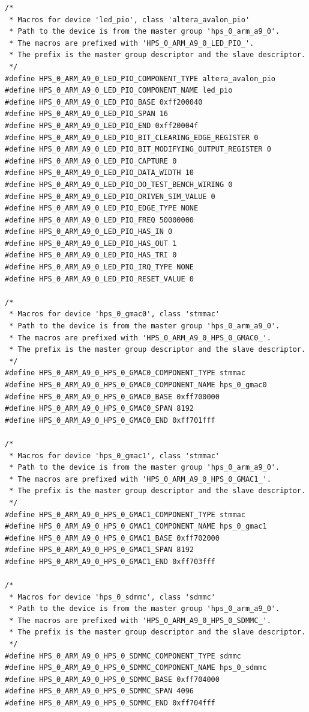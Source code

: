 \documentclass[conference]{IEEEtran}
\begin{document}
\begin{lstlisting}
/*
 * Macros for device 'led_pio', class 'altera_avalon_pio'
 * Path to the device is from the master group 'hps_0_arm_a9_0'.
 * The macros are prefixed with 'HPS_0_ARM_A9_0_LED_PIO_'.
 * The prefix is the master group descriptor and the slave descriptor.
 */
#define HPS_0_ARM_A9_0_LED_PIO_COMPONENT_TYPE altera_avalon_pio
#define HPS_0_ARM_A9_0_LED_PIO_COMPONENT_NAME led_pio
#define HPS_0_ARM_A9_0_LED_PIO_BASE 0xff200040
#define HPS_0_ARM_A9_0_LED_PIO_SPAN 16
#define HPS_0_ARM_A9_0_LED_PIO_END 0xff20004f
#define HPS_0_ARM_A9_0_LED_PIO_BIT_CLEARING_EDGE_REGISTER 0
#define HPS_0_ARM_A9_0_LED_PIO_BIT_MODIFYING_OUTPUT_REGISTER 0
#define HPS_0_ARM_A9_0_LED_PIO_CAPTURE 0
#define HPS_0_ARM_A9_0_LED_PIO_DATA_WIDTH 10
#define HPS_0_ARM_A9_0_LED_PIO_DO_TEST_BENCH_WIRING 0
#define HPS_0_ARM_A9_0_LED_PIO_DRIVEN_SIM_VALUE 0
#define HPS_0_ARM_A9_0_LED_PIO_EDGE_TYPE NONE
#define HPS_0_ARM_A9_0_LED_PIO_FREQ 50000000
#define HPS_0_ARM_A9_0_LED_PIO_HAS_IN 0
#define HPS_0_ARM_A9_0_LED_PIO_HAS_OUT 1
#define HPS_0_ARM_A9_0_LED_PIO_HAS_TRI 0
#define HPS_0_ARM_A9_0_LED_PIO_IRQ_TYPE NONE
#define HPS_0_ARM_A9_0_LED_PIO_RESET_VALUE 0

/*
 * Macros for device 'hps_0_gmac0', class 'stmmac'
 * Path to the device is from the master group 'hps_0_arm_a9_0'.
 * The macros are prefixed with 'HPS_0_ARM_A9_0_HPS_0_GMAC0_'.
 * The prefix is the master group descriptor and the slave descriptor.
 */
#define HPS_0_ARM_A9_0_HPS_0_GMAC0_COMPONENT_TYPE stmmac
#define HPS_0_ARM_A9_0_HPS_0_GMAC0_COMPONENT_NAME hps_0_gmac0
#define HPS_0_ARM_A9_0_HPS_0_GMAC0_BASE 0xff700000
#define HPS_0_ARM_A9_0_HPS_0_GMAC0_SPAN 8192
#define HPS_0_ARM_A9_0_HPS_0_GMAC0_END 0xff701fff

/*
 * Macros for device 'hps_0_gmac1', class 'stmmac'
 * Path to the device is from the master group 'hps_0_arm_a9_0'.
 * The macros are prefixed with 'HPS_0_ARM_A9_0_HPS_0_GMAC1_'.
 * The prefix is the master group descriptor and the slave descriptor.
 */
#define HPS_0_ARM_A9_0_HPS_0_GMAC1_COMPONENT_TYPE stmmac
#define HPS_0_ARM_A9_0_HPS_0_GMAC1_COMPONENT_NAME hps_0_gmac1
#define HPS_0_ARM_A9_0_HPS_0_GMAC1_BASE 0xff702000
#define HPS_0_ARM_A9_0_HPS_0_GMAC1_SPAN 8192
#define HPS_0_ARM_A9_0_HPS_0_GMAC1_END 0xff703fff

/*
 * Macros for device 'hps_0_sdmmc', class 'sdmmc'
 * Path to the device is from the master group 'hps_0_arm_a9_0'.
 * The macros are prefixed with 'HPS_0_ARM_A9_0_HPS_0_SDMMC_'.
 * The prefix is the master group descriptor and the slave descriptor.
 */
#define HPS_0_ARM_A9_0_HPS_0_SDMMC_COMPONENT_TYPE sdmmc
#define HPS_0_ARM_A9_0_HPS_0_SDMMC_COMPONENT_NAME hps_0_sdmmc
#define HPS_0_ARM_A9_0_HPS_0_SDMMC_BASE 0xff704000
#define HPS_0_ARM_A9_0_HPS_0_SDMMC_SPAN 4096
#define HPS_0_ARM_A9_0_HPS_0_SDMMC_END 0xff704fff


\end{lstlisting}
\end{document}
